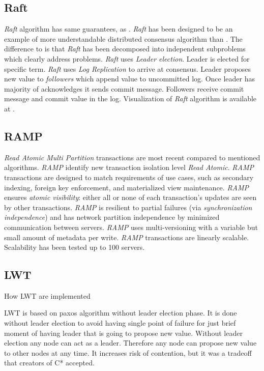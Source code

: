 \subsection{Raft}
\emph{Raft} algorithm has same guarantees, as \paxos. \emph{Raft} has been designed to be an example of more understandable distributed consensus algorithm than \paxos. \cite{ongaro2014search} The difference to \paxos  is that \emph{Raft} has been decomposed into independent subproblems which clearly address problems. \emph{Raft} uses \emph{Leader election}. Leader is elected for specific term. \emph{Raft} uses \emph{Log Replication} to arrive at consensus. Leader proposes new value to \emph{followers} which append value to uncommitted log. Once leader has majority of acknowledges it sends commit message. Followers receive commit message and commit value in the log. Visualization of \emph{Raft} algorithm is available at \cite{raftVisual}.

\subsection{RAMP}
\emph{Read Atomic Multi Partition} transactions \cite{Bailis:2014} are most recent compared to mentioned algorithms. \emph{RAMP} identify new transaction isolation level \emph{Read Atomic}. \emph{RAMP} transactions are designed to match requirements of use cases, such as secondary indexing, foreign key
enforcement, and materialized view maintenance. \emph{RAMP} ensures \emph{atomic visibility}: either all or none of each transaction's updates are seen by other transactions. \emph{RAMP} is resilient to partial failures (via \emph{synchronization independence}) and has network partition independence by minimized communication between servers. \emph{RAMP} uses multi-versioning with a variable but small amount of metadata per write. \emph{RAMP} transactions are linearly scalable. Scalability has been tested up to 100 servers.

\subsection{LWT}

 How LWT are implemented


LWT is based on paxos algorithm without leader election phase. It is done without leader election to avoid having single point of failure for just brief moment of having leader that is going to propose new value. Without leader election any node can act as a leader. Therefore any node can propose new value to other nodes at any time. It increases risk of contention, but it was a tradeoff that creators of C* accepted. 


